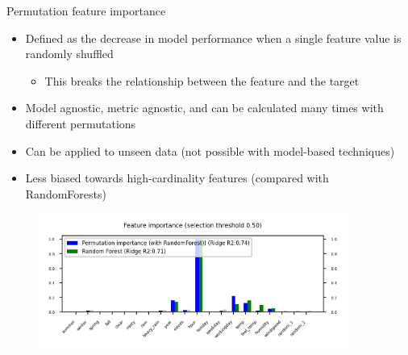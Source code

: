 \begin{frame}[allowframebreaks]{Permutation feature importance}
\begin{itemize}
    \item Defined as the decrease in model performance when a single feature value is randomly shuffled
    \begin{itemize}
        \item This breaks the relationship between the feature and the target
    \end{itemize}
    \item Model agnostic, metric agnostic, and can be calculated many times with different permutations
    \item Can be applied to unseen data (not possible with model-based techniques)
    \item Less biased towards high-cardinality features (compared with RandomForests)
\end{itemize}

\begin{figure}
    \centering
    \includegraphics[width=0.9\textwidth]{images/pre-processing/permutation.png}
\end{figure}
\end{frame}


